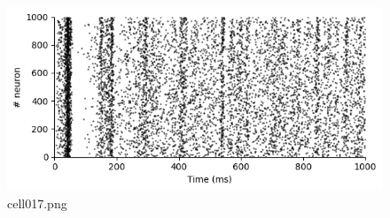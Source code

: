 \begin{figure}[ht]
	\centering
	\includegraphics[scale=0.8, max width=\linewidth]{./fig/neuron-model/izhikevich/cell017.png}
	\caption{cell017.png}
	\label{cell017.png}
\end{figure}